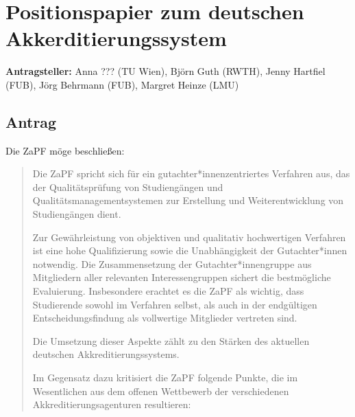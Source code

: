 \documentclass[draft,10pt,oneside]{scrartcl}
\begin{document}
\section*{Positionspapier zum deutschen Akkerditierungssystem}

\textbf{Antragsteller:} Anna ??? (TU Wien), Björn Guth (RWTH), Jenny Hartfiel (FUB), Jörg Behrmann (FUB), Margret Heinze (LMU)

\subsection*{Antrag}

Die ZaPF möge beschließen:

\begin{quote}
	Die ZaPF spricht sich für ein gutachter*innenzentriertes Verfahren aus, das
	der Qualitätsprüfung von Studiengängen und Qualitätsmanagementsystemen zur
	Erstellung und Weiterentwicklung von Studiengängen dient.

	Zur Gewährleistung von objektiven und qualitativ hochwertigen Verfahren ist
	eine hohe Qualifizierung sowie die Unabhängigkeit der Gutachter*innen
	notwendig. Die Zusammensetzung der Gutachter*innengruppe aus Mitgliedern
	aller relevanten Interessengruppen sichert die bestmögliche Evaluierung.
	Insbesondere erachtet es die ZaPF als wichtig, dass Studierende sowohl im
	Verfahren selbst, als auch in der endgültigen Entscheidungsfindung als
	vollwertige Mitglieder vertreten sind.

	Die Umsetzung dieser Aspekte zählt zu den Stärken des aktuellen deutschen
	Akkreditierungssystems.

	Im Gegensatz dazu kritisiert die ZaPF folgende Punkte, die im Wesentlichen
	aus dem offenen Wettbewerb der verschiedenen Akkreditierungsagenturen
	resultieren:


\end{quote}
\end{document}
